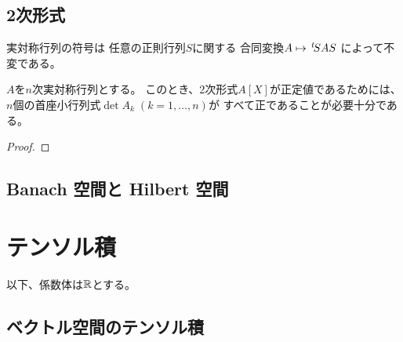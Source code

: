 \documentclass[report]{jlreq}
\begin{document}
%
\section{2次形式}

\begin{definition}[符号]
    \TODO{}
\end{definition}

\begin{theorem}
    \TODO{}
    実対称行列の符号は
    任意の正則行列$S$に関する
    合同変換$A \mapsto \,{}^{t}\!SAS$
    によって不変である。
\end{theorem}


\begin{proposition}[正定値性の判定]
    $A$を$n$次実対称行列とする。
    このとき、2次形式$A[X]$が正定値であるためには、
    $n$個の首座小行列式$\det A_k \; (k = 1, \dots, n)$が
    すべて正であることが必要十分である。
\end{proposition}

\begin{proof}
    \TODO{}
\end{proof}

%
\section{Banach 空間と Hilbert 空間}

\TODO{}








%
\chapter{テンソル積}

以下、係数体は$\mathbb{R}$とする。

%
\section{ベクトル空間のテンソル積}
\end{document}
